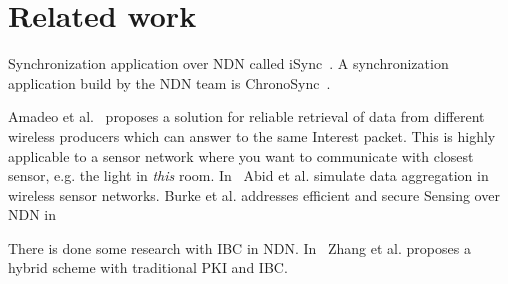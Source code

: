 \section{Related work}
Synchronization application over \gls{NDN} called iSync~\cite{DBLP:conf/acmicn/FuAC14}.
A synchronization application build by the \gls{NDN} team is ChronoSync~\cite{DBLP:conf/icnp/ZhuA13}.

Amadeo et al.~\cite{DBLP:conf/acmicn/AmadeoCM14} proposes a solution for reliable retrieval of data from different wireless producers which can answer to the same Interest packet. This is highly applicable to a sensor network where you want to communicate with closest sensor, e.g. the light in \textit{this} room.
In~\cite{DBLP:conf/noms/AbidySLF14} Abid et al. simulate data aggregation in wireless sensor networks.
Burke et al. addresses efficient and secure Sensing over \gls{NDN} in~\cite{DBLP:conf/nca/BurkeGNT14}

There is done some research with \gls{IBC} in \gls{NDN}. In~\cite{DBLP:conf/icnp/ZhangCXWSW11} Zhang et al. proposes a hybrid scheme with traditional \gls{PKI} and \gls{IBC}.